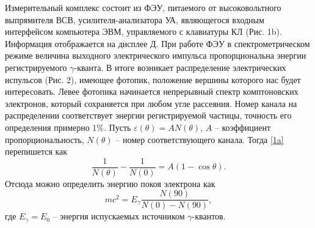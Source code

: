 \documentclass[a4paper,12pt]{article}
\theoremstyle{definition}
\begin{document}
Измерительный комплекс состоит из ФЭУ, питаемого от высоковольтного выпрямителя ВСВ, усилителя-анализатора УА, являющегося входным интерфейсом компьютера ЭВМ, управляемого с клавиатуры КЛ (Рис. 1b). Информация отображается на дисплее Д. При работе ФЭУ в спектрометрическом режиме величина выходного электрического импульса пропорциональна энергии регистрируемого $\gamma$-кванта. В итоге возникает распределение электрических испульсов (Рис. 2), имеющее фотопик, положение вершины которого нас будет интересовать. Левее фотопика начинается непрерывный спектр комптоновских электронов, который сохраняется при любом угле рассеяния. Номер канала на распределении соответствует энергии регистрируемой частицы, точность его определения примерно $1\%$.
\newpage
Пусть $\varepsilon(\theta) = AN(\theta)$, $A$ -- коэффициент пропорциональность, $N(\theta)$ -- номер соответствующего канала. Тогда \eqref{1a} перепишется как
\[\tag{1b}\label{1b}
\dfrac{1}{N(\theta)} - \dfrac{1}{N(0)} = A(1-\cos \theta).\]
Отсюда можно определить энергию покоя электрона как 
\begin{equation}\label{2}
mc^2 = E_\gamma \dfrac{N(90)}{N(0) - N(90)},
\end{equation}
где $E_\gamma = E_0$ -- энергия испускаемых источником $\gamma$-квантов.
\end{document}
